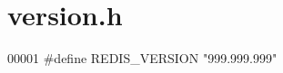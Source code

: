 \hypertarget{version_8h_source}{}\section{version.\+h}
\label{version_8h_source}

\begin{DoxyCode}
00001 \textcolor{preprocessor}{#}\textcolor{preprocessor}{define} \textcolor{preprocessor}{REDIS\_VERSION} \textcolor{stringliteral}{"999.999.999"}
\end{DoxyCode}
